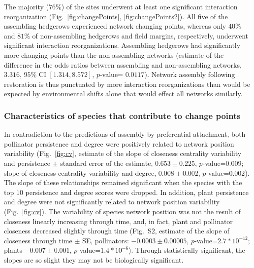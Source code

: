 \documentclass[12pt]{article}
\begin{document}
The majority ($76\%$) of the sites underwent at least one significant
interaction reorganization (Fig.~\ref{fig:changePoints},
\ref{fig:changePoints2}).  All five of the assembling hedgerows
experienced network changing points, whereas only $40\%$ and $81\%$ of
non-assembling hedgerows and field margins, respectively, underwent
significant interaction reorganizations. Assembling hedgerows had
significantly more changing points than the non-assembling networks
(estimate of the difference in the odds ratios between assembling and
non-assembling networks, $3.316$, $95\%$ CI $[1.314, 8.572]$,
$p$-value= $0.0117$). Network assembly following restoration is thus
punctuated by more interaction reorganizations than would be expected
by environmental shifts alone that would effect all networks
similarly.

\subsubsection*{Characteristics of species that contribute to change
  points}

In contradiction to the predictions of assembly by preferential
attachment, both pollinator persistence and degree were positively
related to network position variability (Fig.~\ref{fig:cv}, estimate
of the slope of closeness centrality variability and persistence $\pm$
standard error of the estimate, $0.653 \pm 0.225$, $p$-value=$0.009$;
slope of closeness centrality variability and degree, $0.008 \pm
0.002$, $p$-value=$0.002$). The slope of these relationships remained
significant when the species with the top $10$ persistence and degree
scores were dropped. In addition, plant persistence and degree were
not significantly related to network position variability
(Fig.~\ref{fig:cv}). %
The variability of species network position was not the result of
closeness linearly increasing through time, and, in fact, plant and
pollinator closeness decreased slightly through time (Fig.~S2,
estimate of the slope of closeness through time $\pm$ SE, pollinators:
$-0.0003 \pm 0.00005$, $p$-value=$2.7*10^{-12}$; plants $-0.007 \pm
0.001$, $p$-value=$1.4*10^{-6}$). Through statistically significant,
the slopes are so slight they may not be biologically significant.
\end{document}
